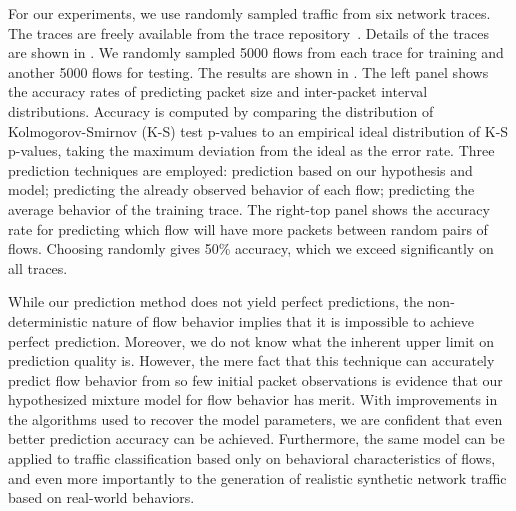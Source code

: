 \documentclass{acm_proc_article-sp}
\begin{document}
For our experiments, we use randomly sampled traffic from six network traces.
The traces are freely available from the  trace repository~\cite{Yeo06}.
Details of the traces are shown in .
We randomly sampled 5000 flows from each trace for training and another 5000 flows for testing.
The results are shown in .
The left panel shows the accuracy rates of predicting packet size and inter-packet interval distributions.
Accuracy is computed by comparing the distribution of Kolmogorov-Smirnov (K-S) test p-values to an empirical ideal distribution of K-S p-values, taking the maximum deviation from the ideal as the error rate.
Three prediction techniques are employed:
prediction based on our hypothesis and model;
predicting the already observed behavior of each flow;
predicting the average behavior of the training trace.
The right-top panel shows the accuracy rate for predicting which flow will have more packets between random pairs of flows.
Choosing randomly gives 50\% accuracy, which we exceed significantly on all traces.

While our prediction method does not yield perfect predictions, the non-deterministic nature of flow behavior implies that it is impossible to achieve perfect prediction.
Moreover, we do not know what the inherent upper limit on prediction quality is.
However, the mere fact that this technique can accurately predict flow behavior from so few initial packet observations is evidence that our hypothesized mixture model for flow behavior has merit.
With improvements in the algorithms used to recover the model parameters, we are confident that even better prediction accuracy can be achieved.
Furthermore, the same model can be applied to traffic classification based only on behavioral characteristics of flows, and even more importantly to the generation of realistic synthetic network traffic based on real-world behaviors.

\scriptsize

\end{document}
